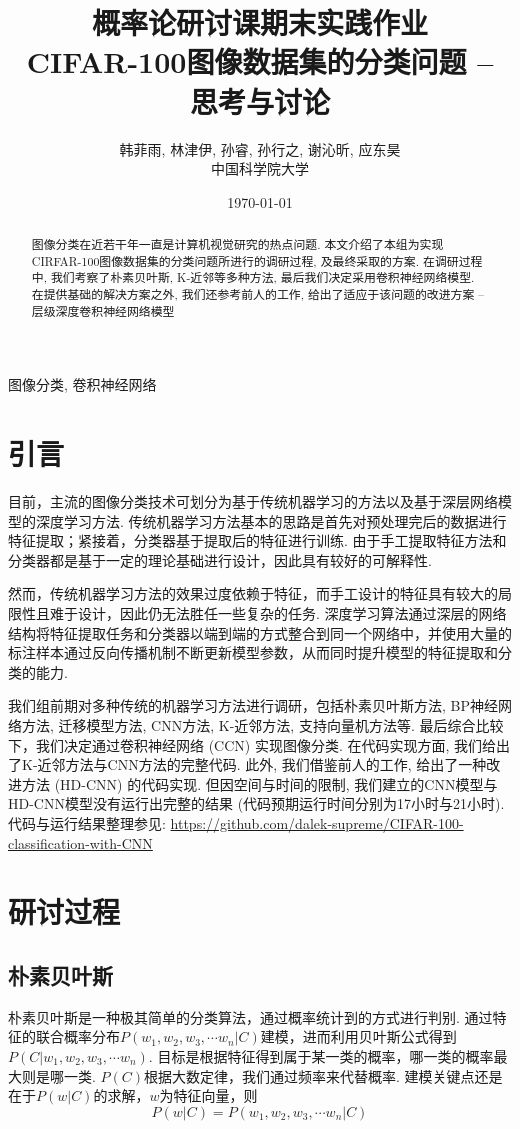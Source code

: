 \documentclass[lang=cn, 11pt,   a4paper]{elegantpaper}
\title{概率论研讨课期末实践作业\\ CIFAR-100图像数据集的分类问题 -- 思考与讨论}
\author{韩菲雨, 林津伊, 孙睿, 孙行之, 谢沁昕, 应东昊\\中国科学院大学}
\date{\today}
\begin{document}
\maketitle

\begin{abstract}
图像分类在近若干年一直是计算机视觉研究的热点问题. 本文介绍了本组为实现CIRFAR-100图像数据集的分类问题所进行的调研过程, 及最终采取的方案. 在调研过程中, 我们考察了朴素贝叶斯, K-近邻等多种方法, 最后我们决定采用卷积神经网络模型. 在提供基础的解决方案之外, 我们还参考前人的工作, 给出了适应于该问题的改进方案 -- 层级深度卷积神经网络模型
\end{abstract}

\keywords{} 图像分类, 卷积神经网络


\tableofcontents

\section{引言}
目前，主流的图像分类技术可划分为基于传统机器学习的方法以及基于深层网络模型的深度学习方法. 传统机器学习方法基本的思路是首先对预处理完后的数据进行特征提取；紧接着，分类器基于提取后的特征进行训练. 由于手工提取特征方法和分类器都是基于一定的理论基础进行设计，因此具有较好的可解释性. 

然而，传统机器学习方法的效果过度依赖于特征，而手工设计的特征具有较大的局限性且难于设计，因此仍无法胜任一些复杂的任务. 深度学习算法通过深层的网络结构将特征提取任务和分类器以端到端的方式整合到同一个网络中，并使用大量的标注样本通过反向传播机制不断更新模型参数，从而同时提升模型的特征提取和分类的能力. 

我们组前期对多种传统的机器学习方法进行调研，包括朴素贝叶斯方法, BP神经网络方法, 迁移模型方法, CNN方法, K-近邻方法, 支持向量机方法等. 最后综合比较下，我们决定通过卷积神经网络 (CCN) 实现图像分类. 在代码实现方面, 我们给出了K-近邻方法与CNN方法的完整代码. 此外, 我们借鉴前人的工作, 给出了一种改进方法 (HD-CNN) 的代码实现. 但因空间与时间的限制, 我们建立的CNN模型与HD-CNN模型没有运行出完整的结果 (代码预期运行时间分别为17小时与21小时). 代码与运行结果整理参见: \href{https://github.com/dalek-supreme/CIFAR-100-classification-with-CNN}{https://github.com/dalek-supreme/CIFAR-100-classification-with-CNN}

\section{研讨过程}
\subsection{朴素贝叶斯}
朴素贝叶斯是一种极其简单的分类算法，通过概率统计到的方式进行判别. 通过特征的联合概率分布$P\left (w_{1}, w_{2}, w_{3}, \cdots w_{n} | C\right)$建模，进而利用贝叶斯公式得到$P\left (C | w_{1}, w_{2}, w_{3}, \cdots w_{n}\right)$. 目标是根据特征得到属于某一类的概率，哪一类的概率最大则是哪一类. $P (C)$根据大数定律，我们通过频率来代替概率. 建模关键点还是在于$P (w|C)$的求解，$w$为特征向量，则
\begin{equation}
P (w | C)=P\left (w_{1}, w_{2}, w_{3}, \cdots w_{n} | C\right)
\end{equation}
\end{document}
